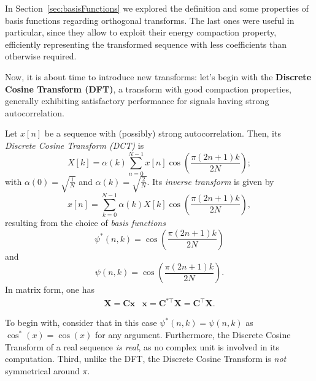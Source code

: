\documentclass[\documentfontsize, twocolumn]{\classname}
\begin{document}
In Section~\ref{sec:basisFunctions} we explored the definition and some properties of basis functions regarding orthogonal transforms. The last ones were useful in particular, since they allow to exploit their energy compaction property, efficiently representing the transformed sequence with less coefficients than otherwise required.

Now, it is about time to introduce new transforms: let's begin with the \textbf{Discrete Cosine Transform (DFT)}, a transform with good compaction properties, generally exhibiting satisfactory performance for signals having strong autocorrelation.

\begin{defin}
    Let $x[n]$ be a sequence with (possibly) strong autocorrelation. Then, its \emph{Discrete Cosine Transform (DCT)} is
    \begin{equation}\label{eqn:discreteCosineTransform}
        X[k] = \alpha(k) \sum_{n=0}^{N-1} x[n] \cos{\left(\frac{\pi(2n + 1)k}{2N}\right)};
    \end{equation}
    with $\alpha(0) = \sqrt{\frac 1 N}$ and $\alpha(k) = \sqrt{ \frac 2 N }$. Its \emph{inverse transform} is given by
    \begin{equation}\label{eqn:discreteCosineTransformInverse}
        x[n] = \sum_{k=0}^{N-1}\alpha(k)  X[k] \cos{\left(\frac{\pi(2n + 1)k}{2N}\right)},
    \end{equation}
    resulting from the choice of \emph{basis functions} \[\psi^*(n, k) = \cos{\left(\frac{\pi(2n + 1)k}{2N}\right)}\] and \[\psi(n, k) = \cos{\left(\frac{\pi(2n + 1)k}{2N}\right)}.\]
    In matrix form, one has
    \begin{equation}\label{eqn:discreteCosineTransformMatrixForm}
        \begin{array}{cc}
            \bm X = \bm{Cx} & \bm x = \bm C^{*\top} \bm X = \bm C^\top \bm X.
        \end{array}
    \end{equation}
\end{defin}

To begin with, consider that in this case $\psi^*(n, k) = \psi(n, k)$ as $\cos^*{(x)} = \cos{(x)}$ for any argument. Furthermore, the Discrete Cosine Transform of a real sequence \emph{is real}, as no complex unit is involved in its computation. Third, unlike the DFT, the Discrete Cosine Transform is \emph{not} symmetrical around $\pi$.
\end{document}
